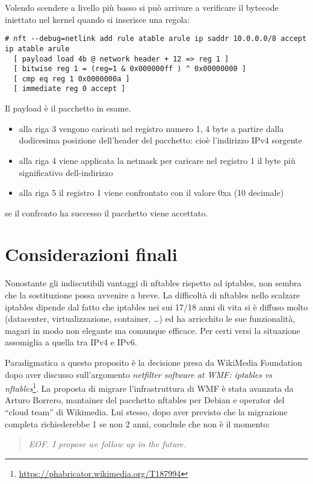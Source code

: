 Volendo scendere a livello pi\`u basso si pu\`o arrivare a verificare il
bytecode iniettato nel kernel quando si inserisce una regola:
\begin{lstlisting}[style=customc]
# nft --debug=netlink add rule atable arule ip saddr 10.0.0.0/8 accept            
ip atable arule
  [ payload load 4b @ network header + 12 => reg 1 ]
  [ bitwise reg 1 = (reg=1 & 0x000000ff ) ^ 0x00000000 ]
  [ cmp eq reg 1 0x0000000a ]
  [ immediate reg 0 accept ]
\end{lstlisting}
Il payload \`e il pacchetto in esame.
\begin{itemize}
    \item alla riga 3 vengono caricati nel registro numero 1, 4 byte a partire dalla dodicesima posizione dell'header del
pacchetto: cio\`e l'indirizzo IPv4 sorgente
    \item alla riga 4 viene applicata la netmask per caricare nel registro 1
        il byte pi\`u significativo dell-indirizzo
    \item alla riga 5 il registro 1 viene confrontato con il valore 0xa (10 decimale)
\end{itemize}
se il confronto ha successo il pacchetto viene accettato.

\chapter{Considerazioni finali}

Nonostante gli indiscutibili vantaggi di nftables rispetto ad iptables, non
sembra che la sostituzione possa avvenire a breve.  La difficolt\`a di
nftables nello scalzare iptables dipende dal fatto che iptables nei sui 17/18
anni di vita si \`e diffuso molto (datacenter, virtualizzazione, container,
\ldots) ed ha arricchito le sue funzionalit\`a, magari in modo non elegante ma
comunque efficace. Per certi versi la situazione assomiglia a quella tra IPv4
e IPv6.

Paradigmatica a questo proposito \`e la decisione presa da WikiMedia Foundation
dopo aver discusso sull'argomento {\em netfilter software at WMF: iptables vs
nftables}\footnote{\url{https://phabricator.wikimedia.org/T187994}}.  La
proposta di migrare l'infrastruttura di WMF \`e stata avanzata da Arturo
Borrero, mantainer del pacchetto nftables per Debian e operator del ``cloud
team'' di Wikimedia. Lui stesso, dopo aver previsto che la migrazione completa
richiederebbe 1 se non 2 anni, conclude che non \`e il momento:
\begin{quote}
    {\em EOF. I propose we follow up in the future.}
\end{quote}

